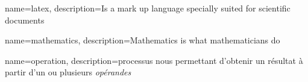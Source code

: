 \makeglossaries

{
    name=latex,
    description={Is a mark up language specially suited
    for scientific documents}
}

{
    name=mathematics,
    description={Mathematics is what mathematicians do}
}

{
    name=operation,
    description={processus nous permettant d'obtenir un résultat à partir d'un ou plusieurs \emph{opérandes}}
}